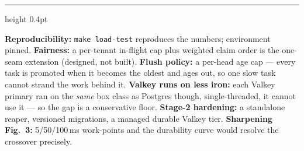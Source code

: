 \documentclass[10pt]{article}
\begin{document}
\vspace{1pt}
{\color{rule}\hrule height 0.4pt}
\vspace{2pt}
{\scriptsize\color{ink!85}
\textbf{Reproducibility:} \texttt{make load-test} reproduces the numbers; environment
pinned. \textbf{Fairness:} a per-tenant in-flight cap plus weighted claim order
is the one-seam extension (designed, not built). \textbf{Flush policy:} a per-head age
cap --- every task is promoted when it becomes the oldest and ages out, so one slow task
cannot strand the work behind it. \textbf{Valkey runs on less iron:}
each Valkey primary ran on the \emph{same} box class as Postgres though,
single-threaded, it cannot use it --- so the gap is a conservative floor.
\textbf{Stage-2 hardening:} a standalone reaper, versioned migrations, a managed
durable Valkey tier. \textbf{Sharpening Fig.~3:} 5/50/100\,ms work-points and the
durability curve would resolve the crossover precisely.
}
\end{document}
